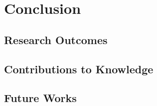 \chapter{Conclusion}
\label{chap:conclusion}
\section{Research Outcomes}
\section{Contributions to Knowledge}
\section{Future Works}